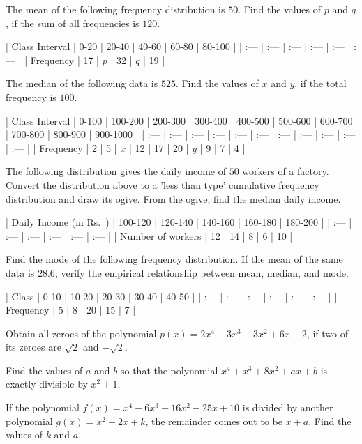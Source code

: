 \documentclass[12pt,a4paper]{exam}
\begin{document}
\begin{questions}
\question[5] The mean of the following frequency distribution is $50$. Find the values of $p$ and $q$, if the sum of all frequencies is $120$. 

| Class Interval | 0-20 | 20-40 | 40-60 | 60-80 | 80-100 |
| :--- | :--- | :--- | :--- | :--- | :--- |
| Frequency | 17 | $p$ | 32 | $q$ | 19 |
\vspace{0.15cm}

\question[5] The median of the following data is $525$. Find the values of $x$ and $y$, if the total frequency is $100$.

| Class Interval | 0-100 | 100-200 | 200-300 | 300-400 | 400-500 | 500-600 | 600-700 | 700-800 | 800-900 | 900-1000 |
| :--- | :--- | :--- | :--- | :--- | :--- | :--- | :--- | :--- | :--- | :--- |
| Frequency | 2 | 5 | $x$ | 12 | 17 | 20 | $y$ | 9 | 7 | 4 |
\vspace{0.15cm}

\question[5] The following distribution gives the daily income of $50$ workers of a factory. Convert the distribution above to a 'less than type' cumulative frequency distribution and draw its ogive. From the ogive, find the median daily income.

| Daily Income (in Rs.~) | 100-120 | 120-140 | 140-160 | 160-180 | 180-200 |
| :--- | :--- | :--- | :--- | :--- | :--- |
| Number of workers | 12 | 14 | 8 | 6 | 10 |
\vspace{0.15cm}

\question[5] Find the mode of the following frequency distribution. If the mean of the same data is $28.6$, verify the empirical relationship between mean, median, and mode.

| Class | 0-10 | 10-20 | 20-30 | 30-40 | 40-50 |
| :--- | :--- | :--- | :--- | :--- | :--- |
| Frequency | 5 | 8 | 20 | 15 | 7 |
\vspace{0.15cm}

\question[5] Obtain all zeroes of the polynomial $p(x) = 2x^4 - 3x^3 - 3x^2 + 6x - 2$, if two of its zeroes are $\sqrt{2}$ and $-\sqrt{2}$.
\vspace{0.15cm}

\question[5] Find the values of $a$ and $b$ so that the polynomial $x^4 + x^3 + 8x^2 + ax + b$ is exactly divisible by $x^2 + 1$.
\vspace{0.15cm}

\question[5] If the polynomial $f(x) = x^4 - 6x^3 + 16x^2 - 25x + 10$ is divided by another polynomial $g(x) = x^2 - 2x + k$, the remainder comes out to be $x + a$. Find the values of $k$ and $a$.
\vspace{0.15cm}


\end{questions}
\end{document}
